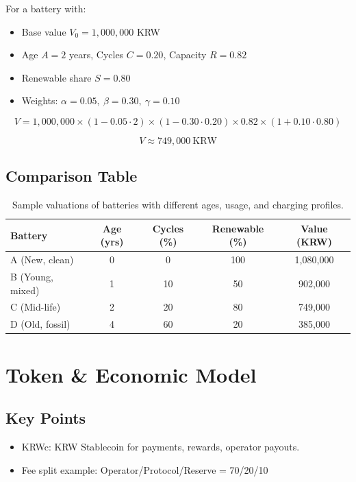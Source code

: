 \documentclass[12pt,a4paper]{article}
\begin{document}
For a battery with:
\begin{itemize}[leftmargin=1.5em]
  \item Base value $V_{0} = 1{,}000{,}000$ KRW
  \item Age $A=2$ years, Cycles $C=0.20$, Capacity $R=0.82$
  \item Renewable share $S=0.80$
  \item Weights: $\alpha=0.05,\ \beta=0.30,\ \gamma=0.10$
\end{itemize}

\[
V = 1{,}000{,}000 \times (1-0.05\cdot2) \times (1-0.30\cdot0.20) \times 0.82 \times (1+0.10\cdot0.80)
\]

\[
V \approx 749{,}000\ \text{KRW}
\]

\subsection{Comparison Table}

\begin{table}[H]
\centering
\begin{tabular}{lcccc}
\toprule
\textbf{Battery} & \textbf{Age (yrs)} & \textbf{Cycles (\%)} & \textbf{Renewable (\%)} & \textbf{Value (KRW)} \\
\midrule
A (New, clean)   & 0 & 0   & 100 & 1,080,000 \\
B (Young, mixed) & 1 & 10  & 50  & 902,000   \\
C (Mid-life)     & 2 & 20  & 80  & 749,000   \\
D (Old, fossil)  & 4 & 60  & 20  & 385,000   \\
\bottomrule
\end{tabular}
\caption{Sample valuations of batteries with different ages, usage, and charging profiles.}
\end{table}


\section{Token \& Economic Model}
\subsection{Key Points}
\begin{itemize}
    \item KRWc: KRW Stablecoin for payments, rewards, operator payouts.
    \item Fee split example: Operator/Protocol/Reserve = 70/20/10
\end{itemize}
\end{document}
